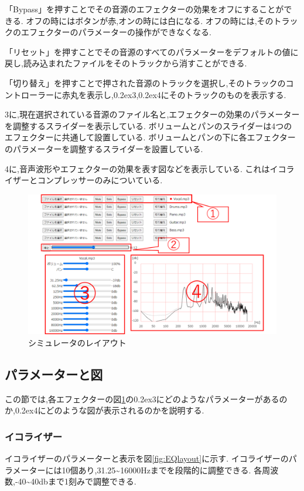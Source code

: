 \documentclass[12pt,a4j,titlepage]{ltjsarticle}
\begin{document}
「Bypass」を押すことでその音源のエフェクターの効果をオフにすることができる.
オフの時にはボタンが赤,オンの時には白になる.
オフの時には,そのトラックのエフェクターのパラメーターの操作ができなくなる.

「リセット」を押すことでその音源のすべてのパラメーターをデフォルトの値に戻し,読み込まれたファイルをそのトラックから消すことができる.

「切り替え」を押すことで押された音源のトラックを選択し,そのトラックのコントローラーに赤丸を表示し,\raise0.2ex\hbox{\textcircled{\scriptsize{3}}},\raise0.2ex\hbox{\textcircled{\scriptsize{4}}}にそのトラックのものを表示する.

\textcircled{\scriptsize{3}}に,現在選択されている音源のファイル名と,エフェクターの効果のパラメーターを調整するスライダーを表示している.
ボリュームとパンのスライダーは4つのエフェクターに共通して設置している.
ボリュームとパンの下に各エフェクターのパラメーターを調整するスライダーを設置している.

\textcircled{\scriptsize{4}}に,音声波形やエフェクターの効果を表す図などを表示している.
これはイコライザーとコンプレッサーのみについている.

\begin{figure}[H]
\centering
 \includegraphics[width=150mm]{./figures/layout.pdf}
 \caption{シミュレータのレイアウト}
 \label{fig:layout}
\end{figure}

\subsection{パラメーターと図}
この節では,各エフェクターの図\ref{fig:layout}の\raise0.2ex\hbox{\textcircled{\scriptsize{3}}}にどのようなパラメーターがあるのか,\raise0.2ex\hbox{\textcircled{\scriptsize{4}}}にどのような図が表示されるのかを説明する.
\subsubsection{イコライザー}
イコライザーのパラメーターと表示を図\ref{fig:EQlayout}に示す.
イコライザーのパラメーターには10個あり,31.25\sim16000Hzまでを段階的に調整できる.
各周波数,-40\sim40dbまで1刻みで調整できる.
\end{document}
